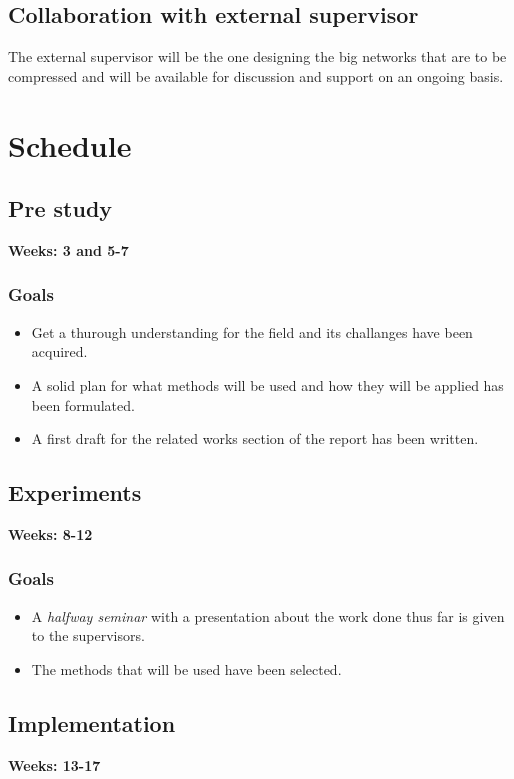 \documentclass[11pt]{article}
\begin{document}
\subsection{Collaboration with external supervisor}
\label{sec:org3491e39}
The external supervisor will be the one designing the big networks that are to be compressed and will be available for discussion and support on an ongoing basis.
\section{Schedule}
\label{sec:orgef13e6a}

\subsection{Pre study}
\label{sec:org6ce9b01}
\textbf{Weeks: 3 and 5-7}

\subsubsection{Goals}
\label{sec:orgc0419cd}
\begin{itemize}
\item Get a thurough understanding for the field and its challanges have been acquired.
\item A solid plan for what methods will be used and how they will be applied has been formulated.
\item A first draft for the related works section of the report has been written.
\end{itemize}

\subsection{Experiments}
\label{sec:org155cb24}
\textbf{Weeks: 8-12}


\subsubsection{Goals}
\label{sec:org957b936}
\begin{itemize}
\item A \emph{halfway seminar} with a presentation about the work done thus far is given to the supervisors.
\item The methods that will be used have been selected.
\end{itemize}
\subsection{Implementation}
\label{sec:org959df57}
\textbf{Weeks: 13-17}
\end{document}
